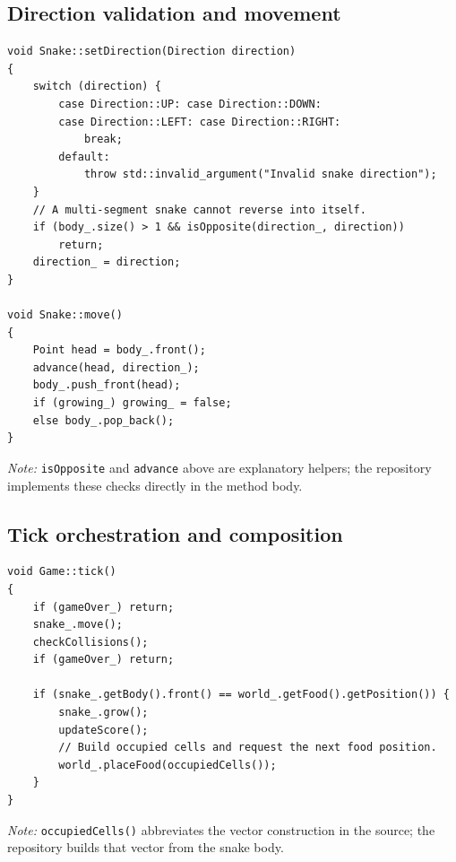 \documentclass[12pt,a4paper]{report}
\begin{document}
\subsection{Direction validation and movement}
\begin{lstlisting}[caption={Snake validates directions and moves its deque body},label={lst:snake}]
void Snake::setDirection(Direction direction)
{
    switch (direction) {
        case Direction::UP: case Direction::DOWN:
        case Direction::LEFT: case Direction::RIGHT:
            break;
        default:
            throw std::invalid_argument("Invalid snake direction");
    }
    // A multi-segment snake cannot reverse into itself.
    if (body_.size() > 1 && isOpposite(direction_, direction))
        return;
    direction_ = direction;
}

void Snake::move()
{
    Point head = body_.front();
    advance(head, direction_);
    body_.push_front(head);
    if (growing_) growing_ = false;
    else body_.pop_back();
}
\end{lstlisting}
\textit{Note:} \texttt{isOpposite} and \texttt{advance} above are explanatory
helpers; the repository implements these checks directly in the method body.

\subsection{Tick orchestration and composition}
\begin{lstlisting}[caption={Game coordinates movement, collisions, and food handling},label={lst:tick}]
void Game::tick()
{
    if (gameOver_) return;
    snake_.move();
    checkCollisions();
    if (gameOver_) return;

    if (snake_.getBody().front() == world_.getFood().getPosition()) {
        snake_.grow();
        updateScore();
        // Build occupied cells and request the next food position.
        world_.placeFood(occupiedCells());
    }
}
\end{lstlisting}
\textit{Note:} \texttt{occupiedCells()} abbreviates the vector construction in
the source; the repository builds that vector from the snake body.
\end{document}
